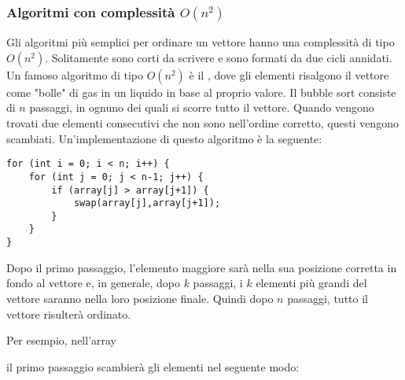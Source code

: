 \subsubsection{Algoritmi con complessità $O(n^2)$}


Gli algoritmi più semplici per ordinare un vettore
hanno una complessità di tipo $O(n^2)$.
Solitamente sono corti da scrivere e sono formati da 
due cicli annidati.
Un famoso algoritmo di tipo $O(n^2)$ è il
, dove gli elementi risalgono il vettore
come "bolle" di gas in un liquido in base al proprio valore.
Il bubble sort consiste di $n$ passaggi, in ognuno dei quali
si scorre tutto il vettore. Quando vengono trovati due elementi consecutivi 
che non sono nell'ordine corretto, questi vengono scambiati.
Un'implementazione di questo algoritmo è la seguente:
\begin{lstlisting}
for (int i = 0; i < n; i++) {
    for (int j = 0; j < n-1; j++) {
        if (array[j] > array[j+1]) {
            swap(array[j],array[j+1]);
        }
    }
}
\end{lstlisting}

Dopo il primo passaggio, l'elemento maggiore sarà nella sua posizione
corretta in fondo al vettore e, in generale, dopo $k$ passaggi,
i $k$ elementi più grandi del vettore saranno nella
loro posizione finale.
Quindi dopo $n$ passaggi, tutto il vettore 
risulterà ordinato.

Per esempio, nell'array

\begin{center}
\end{center}

\noindent
il primo passaggio scambierà gli elementi nel seguente modo:

\begin{center}
\end{center}

